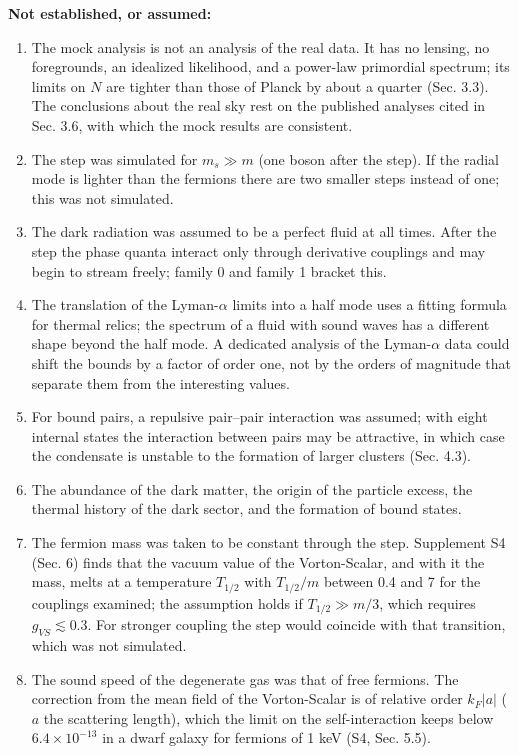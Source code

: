 \documentclass[
  10pt,
]{article}
\providecommand{\tightlist}{%
  \setlength{\itemsep}{0pt}\setlength{\parskip}{0pt}}
\begin{document}
\textbf{Not established, or assumed:}

\begin{enumerate}
\def\labelenumi{\arabic{enumi}.}
\tightlist
\item
  The mock analysis is not an analysis of the real data. It has no
  lensing, no foregrounds, an idealized likelihood, and a power-law
  primordial spectrum; its limits on \(N\) are tighter than those of
  Planck by about a quarter (Sec. 3.3). The conclusions about the real
  sky rest on the published analyses cited in Sec. 3.6, with which the
  mock results are consistent.
\item
  The step was simulated for \(m_s\gg m\) (one boson after the step). If
  the radial mode is lighter than the fermions there are two smaller
  steps instead of one; this was not simulated.
\item
  The dark radiation was assumed to be a perfect fluid at all times.
  After the step the phase quanta interact only through derivative
  couplings and may begin to stream freely; family 0 and family 1
  bracket this.
\item
  The translation of the Lyman-\(\alpha\) limits into a half mode uses a
  fitting formula for thermal relics; the spectrum of a fluid with sound
  waves has a different shape beyond the half mode. A dedicated analysis
  of the Lyman-\(\alpha\) data could shift the bounds by a factor of
  order one, not by the orders of magnitude that separate them from the
  interesting values.
\item
  For bound pairs, a repulsive pair--pair interaction was assumed; with
  eight internal states the interaction between pairs may be attractive,
  in which case the condensate is unstable to the formation of larger
  clusters (Sec. 4.3).
\item
  The abundance of the dark matter, the origin of the particle excess,
  the thermal history of the dark sector, and the formation of bound
  states.
\item
  The fermion mass was taken to be constant through the step. Supplement
  S4 (Sec. 6) finds that the vacuum value of the Vorton-Scalar, and with
  it the mass, melts at a temperature \(T_{1/2}\) with \(T_{1/2}/m\)
  between 0.4 and 7 for the couplings examined; the assumption holds if
  \(T_{1/2}\gg m/3\), which requires \(g_{VS}\lesssim0.3\). For stronger
  coupling the step would coincide with that transition, which was not
  simulated.
\item
  The sound speed of the degenerate gas was that of free fermions. The
  correction from the mean field of the Vorton-Scalar is of relative
  order \(k_F|a|\) (\(a\) the scattering length), which the limit on the
  self-interaction keeps below \(6.4\times10^{-13}\) in a dwarf galaxy
  for fermions of 1 keV (S4, Sec. 5.5).
\end{enumerate}
\end{document}
